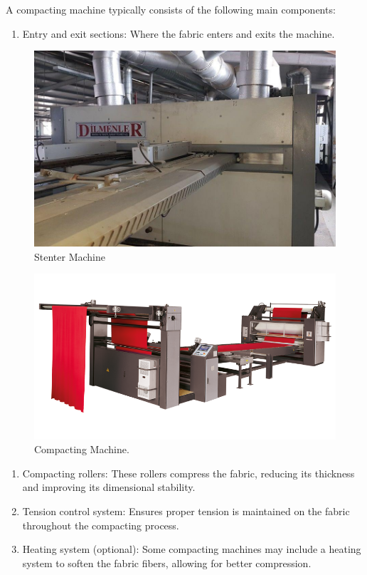 A compacting machine typically consists of the following main
components:


\begin{enumerate}
\item
  Entry and exit sections: Where the fabric enters and exits the
  machine.
\end{enumerate}

\begin{figure}[h!]
  \centering
  \includegraphics[width=0.7\linewidth]{figs/production/image3.jpg}
  \caption{Stenter Machine}
  \label{fig:Stenter Machine}
\end{figure}


\begin{figure}[h!]
  \centering
  \includegraphics[width=0.7\linewidth]{figs/production/image4.png}
  \caption{Compacting Machine.}
  \label{fig:Compacting Machine.}
\end{figure}


\begin{enumerate}
\item
  Compacting rollers: These rollers compress the fabric, reducing its
  thickness and improving its dimensional stability.
\item
  Tension control system: Ensures proper tension is maintained on the
  fabric throughout the compacting process.
\item
  Heating system (optional): Some compacting machines may include a
  heating system to soften the fabric fibers, allowing for better
  compression.
\end{enumerate}

